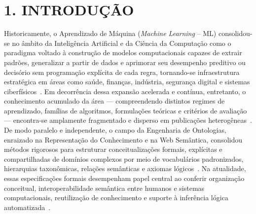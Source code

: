 \documentclass[11pt,a4paper]{article}
\begin{document}
\section{1. INTRODUÇÃO}

Historicamente, o Aprendizado de Máquina (\emph{Machine Learning} -- ML) consolidou-se no âmbito da Inteligência Artificial e da Ciência da Computação como o paradigma voltado à construção de modelos computacionais capazes de extrair padrões, generalizar a partir de dados e aprimorar seu desempenho preditivo ou decisório sem programação explícita de cada regra, tornando-se infraestrutura estratégica em áreas como saúde, finanças, indústria, segurança digital e sistemas ciberfísicos~\cite{sarker2021ml}. Em decorrência dessa expansão acelerada e contínua, entretanto, o conhecimento acumulado da área --- compreendendo distintos regimes de aprendizado, famílias de algoritmos, formulações teóricas e critérios de avaliação --- encontra-se amplamente fragmentado e disperso em publicações heterogêneas~\cite{sarker2021ml}. De modo paralelo e independente, o campo da Engenharia de Ontologias, enraizado na Representação do Conhecimento e na Web Semântica, consolidou métodos rigorosos para estruturar conceitualizações formais, explícitas e compartilhadas de domínios complexos por meio de vocabulários padronizados, hierarquias taxonômicas, relações semânticas e axiomas lógicos~\cite{fernandez1997methontology}. Na atualidade, essas especificações formais desempenham papel central ao conferir organização conceitual, interoperabilidade semântica entre humanos e sistemas computacionais, reutilização de conhecimento e suporte à inferência lógica automatizada~\cite{fernandez1997methontology}.
\end{document}
